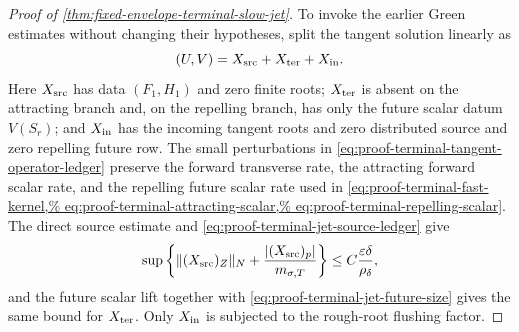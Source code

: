 \begin{proof}[Proof of
\cref{thm:fixed-envelope-terminal-slow-jet}]
To invoke the earlier Green estimates without changing their hypotheses,
split the tangent solution linearly as
\[
 (U,V)=X_{\rm src}+X_{\rm ter}+X_{\rm in}.
\]
Here \(X_{\rm src}\) has data \((F_1,H_1)\) and zero finite roots;
\(X_{\rm ter}\) is absent on the attracting branch and, on the repelling
branch, has only the future scalar datum \(V(S_r)\); and
\(X_{\rm in}\) has the incoming tangent roots and zero distributed source
and zero repelling future row.  The small perturbations in
\cref{eq:proof-terminal-tangent-operator-ledger} preserve the forward
transverse rate, the attracting forward scalar rate, and the repelling
future scalar rate used in
\cref{eq:proof-terminal-fast-kernel,%
eq:proof-terminal-attracting-scalar,%
eq:proof-terminal-repelling-scalar}.  The direct source estimate and
\cref{eq:proof-terminal-jet-source-ledger} give
\[
 \sup\left\{\|(X_{\rm src})_Z\|_N
       +\frac{|(X_{\rm src})_p|}{m_{\sigma,T}}\right\}
 \le C\frac{\varepsilon\delta}{\rho_\delta},
\]
and the future scalar lift together with
\cref{eq:proof-terminal-jet-future-size} gives the same bound for
\(X_{\rm ter}\).  Only \(X_{\rm in}\) is subjected to the rough-root
flushing factor.


\end{proof}
